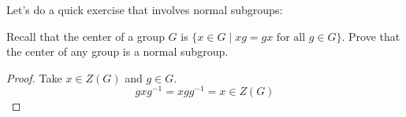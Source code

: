 Let's do a quick exercise that involves normal subgroups: 

\exercise
Recall that the center of a group $G$ is $\{x\in G\mid xg=gx\text{ for all }g\in G\}$. Prove that the center of any group is a normal subgroup. 

\begin{proof}
	Take $x\in Z(G)$ and $g\in G$. 
	\[gxg^{-1} = xgg^{-1} = x\in Z(G)\]
\end{proof}

